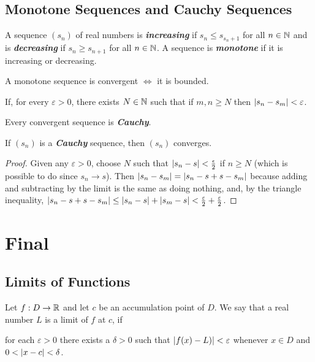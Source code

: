 \documentclass[12pt]{article}
\begin{document}
\subsection{Monotone Sequences and Cauchy Sequences}
\label{sec:org662301d}
\begin{definition}
  A sequence $(s_n)$ of real numbers is \textit{\textbf{increasing}} if $s_n \le
  s_{s_n+1}$ for all $n \in \mathbb{N}$ and is \textit{\textbf{decreasing}} if
  $s_n \ge s_{n+1}$ for all $n \in \mathbb{N}$. A sequence is
  \textbf{\textit{monotone}} if it is increasing or decreasing.
\end{definition}

\begin{definition}
  A monotone sequence is convergent $\iff$ it is bounded.
\end{definition}

\begin{definition}
If, for every $\varepsilon>0$, there exists $N \in \mathbb{N}$ such that if $m,n \ge N$ then
$\left|s_n - s_m\right| < \varepsilon$.

Every convergent sequence is \textit{\textbf{Cauchy}}.

If $(s_n)$ is a \textit{\textbf{Cauchy}} sequence, then $(s_n)$ converges.
\end{definition}

\begin{proof}
   Given any $\varepsilon > 0$, choose $N$ such that $\left|s_n - s\right| < \frac{\epsilon}{2}$ if
  $n \ge N$ (which is possible to do since $s_n \rightarrow s$). Then $\left|s_n - s_m\right| =
  \left|s_n - s + s - s_m\right|$ because adding and subtracting by the limit is the
  same as doing nothing, and, by the triangle inequality, $\left|s_n - s + s -
  s_m\right| \le \left|s_n - s\right| + \left|s_m - s\right| < \frac{\varepsilon}{2} + \frac{\varepsilon}{2}$.
\end{proof}

\section{Final}
\label{sec:org81529e1}
\subsection{Limits of Functions}
\label{sec:orgea0d142}
\begin{definition}[Limit of $f$ at $c$]
  Let $f : D \rightarrow \mathbb{R}$ and let $c$  be an accumulation point of $D$. We
  say that a real number $L$ is a limit of $f$ at $c$, if
  \begin{center}
    for each $\varepsilon > 0$ there exists a $\delta > 0$ such that $\left|f(x)
      - L)\right| < \varepsilon$ whenever $x \in D$ and $0 < \left|x - c\right| < \delta$.
  \end{center}
\end{definition}
\end{document}
